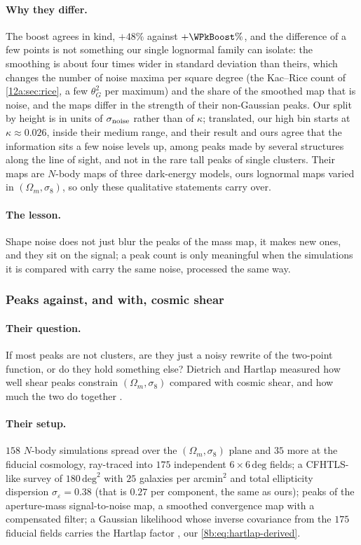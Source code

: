 \paragraph{Why they differ.} The boost agrees in kind, $+48\%$ against $+\WPkBoost\%$, and the difference of a few points is not
something our single lognormal family can isolate: the smoothing is about four times wider in standard deviation
than theirs, which changes the number of noise maxima per square degree (the Kac--Rice count of \cref{12a:sec:rice},
a few $\theta_G^2$ per maximum) and the share of the smoothed map that is noise, and the maps differ in the strength
of their non-Gaussian peaks. Our split by height is in units of $\sigma_{\rm noise}$ rather than of $\kappa$; translated, our
high bin starts at $\kappa\approx0.026$, inside their medium range, and their result and ours agree that the
information sits a few noise levels up, among peaks made by several structures along the line of sight, and not in
the rare tall peaks of single clusters. Their maps are $N$-body maps of three dark-energy models, ours lognormal maps
varied in $(\Omega_m,\sigma_8)$, so only these qualitative statements carry over.

\paragraph{The lesson.} Shape noise does not just blur the peaks of the mass map, it makes new ones, and they sit on
the signal; a peak count is only meaningful when the simulations it is compared with carry the same noise, processed
the same way.

\subsubsection{Peaks against, and with, cosmic shear}
\label{12w:sec:repro-dh}

\paragraph{Their question.} If most peaks are not clusters, are they just a noisy rewrite of the two-point function,
or do they hold something else? Dietrich and Hartlap measured how well shear peaks constrain $(\Omega_m,\sigma_8)$
compared with cosmic shear, and how much the two do together \cite{DietrichHartlap2010}.

\paragraph{Their setup.} $158$ $N$-body simulations spread over the $(\Omega_m,\sigma_8)$ plane and $35$ more at the
fiducial cosmology, ray-traced into $175$ independent $6\times6\,\mathrm{deg}$ fields; a CFHTLS-like survey of
$180\,\mathrm{deg}^2$ with $25$ galaxies per arcmin$^2$ and total ellipticity dispersion $\sigma_\varepsilon=0.38$
(that is $0.27$ per component, the same as ours); peaks of the aperture-mass signal-to-noise map, a smoothed
convergence map with a compensated filter; a Gaussian likelihood whose inverse covariance from the $175$ fiducial
fields carries the Hartlap factor \cite[eq.~12]{DietrichHartlap2010}, our \eqref{8b:eq:hartlap-derived}.

